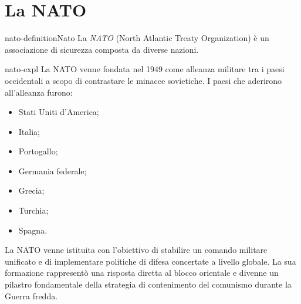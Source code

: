 \documentclass[preview]{standalone}
\begin{document}
\genpage

\section{La NATO}

\begin{snippetdefinition}{nato-definition}{Nato}
    La \textit{NATO} (North Atlantic Treaty Organization) è un associazione di sicurezza composta da diverse nazioni.
\end{snippetdefinition}

\begin{snippet}{nato-expl}
    La NATO venne fondata nel 1949 come alleanza militare
    tra i paesi occidentali a scopo di contrastare le minacce sovietiche.
    I paesi che aderirono all'alleanza furono:
    \begin{itemize}
        \item Stati Uniti d'America;
        \item Italia;
        \item Portogallo;
        \item Germania federale;
        \item Grecia;
        \item Turchia;
        \item Spagna.
    \end{itemize}
    La NATO venne istituita con l'obiettivo di stabilire un comando militare unificato e di implementare politiche
    di difesa concertate a livello globale. La sua formazione rappresentò una risposta diretta al blocco orientale e
    divenne un pilastro fondamentale della strategia di contenimento del comunismo durante la Guerra fredda.
\end{snippet}
\end{document}
